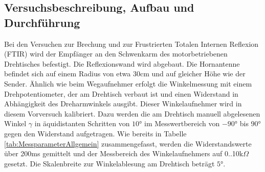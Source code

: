 \documentclass[12pt,a4paper]{article}
\begin{document}
\subsection{Versuchsbeschreibung, Aufbau und Durchführung} 
Bei den Versuchen zur Brechung und zur Frustrierten Totalen Internen Reflexion (FTIR) wird der Empfänger an den Schwenkarm des motorbetriebenen Drehtisches befestigt. Die Reflexionswand wird abgebaut. Die Hornantenne befindet sich auf einem Radius von etwa 30cm und auf gleicher Höhe wie der Sender. Ähnlich wie beim Wegaufnehmer erfolgt die Winkelmessung mit einem Drehpotentiometer, der am Drehtisch verbaut ist und einen Widerstand in Abhängigkeit des Dreharmwinkels ausgibt. Dieser Winkelaufnehmer wird in diesem Vorversuch kalibriert. Dazu werden die am Drehtisch manuell abgelesenen Winkel $\gamma$ in äquidistanten Schritten von $\ang{10}$ im Messwertbereich von $\ang{-90}$ bis $\ang{90}$ gegen den Widerstand aufgetragen. Wie bereits in Tabelle \ref{tab:MessparameterAllgemein} zusammengefasst, werden die Widerstandswerte über 200ms gemittelt und der Messbereich des Winkelaufnehmers auf 0..10k$\Omega$ gesetzt. Die Skalenbreite zur Winkelablesung am Drehtisch beträgt $\ang{5}$.
\end{document}
